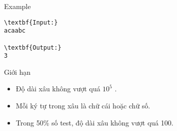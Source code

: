 Example
\begin{verbatim}
\textbf{Input:}
acaabc

\textbf{Output:}
3\end{verbatim}
Giới hạn
\begin{itemize}
	\item Độ dài xâu không vượt quá $10^{5}$ .
	\item Mỗi ký tự trong xâu là chữ cái hoặc chữ số.
	\item Trong 50\% số test, độ dài xâu không vượt quá 100.
\end{itemize}